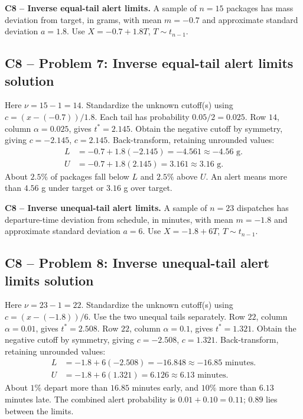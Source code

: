 {
\textbf{C8 -- Inverse equal-tail alert limits.} A sample of $n=15$ packages has mass deviation from target, in grams, with mean $m=-0.7$ and approximate standard deviation $a=1.8$. Use $X=-0.7+1.8T$, $T\sim t_{n-1}$.
\label{sol:q7}
\subsection*{C8 -- Problem 7: Inverse equal-tail alert limits solution }
Here $\nu=15-1=14$. Standardize the unknown cutoff(s) using $c=(x-(-0.7))/1.8$. Each tail has probability $0.05/2=0.025$.
Row $14$, column $\alpha=0.025$, gives $t^*=2.145$. 
Obtain the negative cutoff by symmetry, giving $c=-2.145$, $c=2.145$.
Back-transform, retaining unrounded values:
\[
\begin{aligned}
L&=-0.7+1.8(-2.145)=-4.561\approx\boxed{-4.56\text{ g}}.\\
U&=-0.7+1.8(2.145)=3.161\approx\boxed{3.16\text{ g}}.
\end{aligned}
\]
About $2.5\%$ of packages fall below $L$ and $2.5\%$ above $U$. An alert means more than $4.56$ g under target or $3.16$ g over target.
\secInicio[][sec:q7]
}

{
\textbf{C8 -- Inverse unequal-tail alert limits.} A sample of $n=23$ dispatches has departure-time deviation from schedule, in minutes, with mean $m=-1.8$ and approximate standard deviation $a=6$. Use $X=-1.8+6T$, $T\sim t_{n-1}$.
\label{sol:q8}
\subsection*{C8 -- Problem 8: Inverse unequal-tail alert limits solution }
Here $\nu=23-1=22$. Standardize the unknown cutoff(s) using $c=(x-(-1.8))/6$. Use the two unequal tails separately.
Row $22$, column $\alpha=0.01$, gives $t^*=2.508$. Row $22$, column $\alpha=0.1$, gives $t^*=1.321$. 
Obtain the negative cutoff by symmetry, giving $c=-2.508$, $c=1.321$.
Back-transform, retaining unrounded values:
\[
\begin{aligned}
L&=-1.8+6(-2.508)=-16.848\approx\boxed{-16.85\text{ minutes}}.\\
U&=-1.8+6(1.321)=6.126\approx\boxed{6.13\text{ minutes}}.
\end{aligned}
\]
About $1\%$ depart more than $16.85$ minutes early, and $10\%$ more than $6.13$ minutes late. The combined alert probability is $0.01+0.10=0.11$; $0.89$ lies between the limits.
\secInicio[][sec:q8]
}

